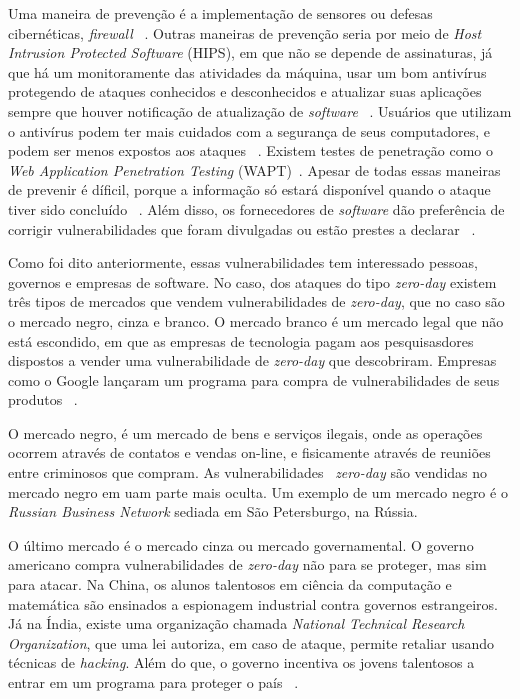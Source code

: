 \documentclass[brazil, utf8]{article}
\begin{document}
Uma maneira de prevenção é a implementação de sensores ou defesas cibernéticas, \textit{firewall} ~\cite{Last:2016}. Outras maneiras de 
prevenção seria por meio de \textit{Host Intrusion Protected Software} (HIPS), em que não se depende de assinaturas, já que há um 
monitoramente das atividades da máquina, usar um bom antivírus  protegendo de ataques conhecidos e desconhecidos e atualizar suas 
aplicações sempre que houver notificação de atualização de \textit{software} ~\cite{Kumar:2016}. Usuários que utilizam o antivírus podem 
ter mais cuidados com a segurança de seus computadores, e podem ser menos expostos aos ataques ~\cite{Bilge:2012}. Existem testes de 
penetração como o \textit{Web Application Penetration Testing} (WAPT)~\cite{Kumar:2016}. Apesar de todas essas maneiras de prevenir é 
díficil, porque a informação só estará disponível quando o ataque tiver sido concluído ~\cite{Kumar:2016}. Além disso, os fornecedores 
de \textit{software} dão preferência de corrigir vulnerabilidades que foram divulgadas ou estão prestes a declarar ~\cite{Bilge:2012}.

Como foi dito anteriormente, essas vulnerabilidades tem interessado pessoas, governos e empresas de software. No caso, dos ataques do 
tipo \textit{zero-day} existem três tipos de mercados que vendem vulnerabilidades de \textit{zero-day}, que no caso são o mercado negro, 
cinza e branco. O mercado branco é um mercado legal que não está escondido, em que as empresas de tecnologia pagam aos pesquisasdores 
dispostos a vender uma vulnerabilidade de \textit{zero-day} que descobriram. Empresas como o Google lançaram um programa para compra de 
vulnerabilidades de seus produtos ~\cite{Fotiet:2015}. 

O mercado negro, é um mercado de bens e serviços ilegais, onde as operações ocorrem através de contatos e vendas on-line, e fisicamente 
através de reuniões entre criminosos que compram. As vulnerabilidades ~\textit{zero-day} são vendidas no mercado negro em uam parte mais 
oculta. Um exemplo de um mercado negro é o \textit{Russian Business Network} sediada em São Petersburgo, na Rússia. 

O último mercado é o mercado cinza ou mercado governamental. O governo americano compra vulnerabilidades de \textit{zero-day} não para se 
proteger, mas sim para atacar. Na China, os alunos talentosos em ciência da computação e matemática são ensinados a espionagem industrial 
contra governos estrangeiros. Já na Índia, existe uma organização chamada \textit{National Technical Research Organization}, que uma lei 
autoriza, em caso de ataque, permite retaliar usando técnicas de \textit{hacking}. Além do que, o governo incentiva os jovens talentosos 
a entrar em um programa para proteger o país ~\cite{Fotiet:2015}.






\end{document}
